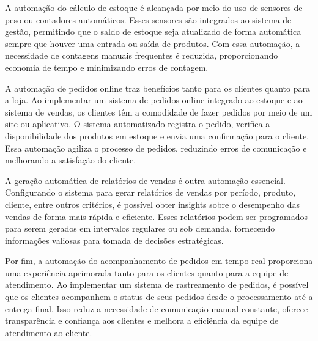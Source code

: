 \documentclass[
	12pt,				%
	openright,			%
	twoside,			%
	a4paper,			%
	english,			%
	brazil				%
	]{abntex2}
\begin{document}
A automação do cálculo de estoque é alcançada por meio do uso de sensores de peso ou contadores automáticos. Esses sensores são integrados ao sistema de gestão, permitindo que o saldo de estoque seja atualizado de forma automática sempre que houver uma entrada ou saída de produtos. Com essa automação, a necessidade de contagens manuais frequentes é reduzida, proporcionando economia de tempo e minimizando erros de contagem.

A automação de pedidos online traz benefícios tanto para os clientes quanto para a loja. Ao implementar um sistema de pedidos online integrado ao estoque e ao sistema de vendas, os clientes têm a comodidade de fazer pedidos por meio de um site ou aplicativo. O sistema automatizado registra o pedido, verifica a disponibilidade dos produtos em estoque e envia uma confirmação para o cliente. Essa automação agiliza o processo de pedidos, reduzindo erros de comunicação e melhorando a satisfação do cliente.

A geração automática de relatórios de vendas é outra automação essencial. Configurando o sistema para gerar relatórios de vendas por período, produto, cliente, entre outros critérios, é possível obter insights sobre o desempenho das vendas de forma mais rápida e eficiente. Esses relatórios podem ser programados para serem gerados em intervalos regulares ou sob demanda, fornecendo informações valiosas para tomada de decisões estratégicas.

Por fim, a automação do acompanhamento de pedidos em tempo real proporciona uma experiência aprimorada tanto para os clientes quanto para a equipe de atendimento. Ao implementar um sistema de rastreamento de pedidos, é possível que os clientes acompanhem o status de seus pedidos desde o processamento até a entrega final. Isso reduz a necessidade de comunicação manual constante, oferece transparência e confiança aos clientes e melhora a eficiência da equipe de atendimento ao cliente.
\end{document}
